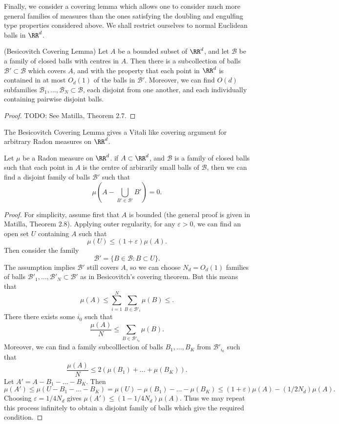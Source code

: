 Finally, we consider a covering lemma which allows one to consider much more general families of measures than the ones satisfying the doubling and engulfing type properties considered above. We shall restrict ourselves to normal Euclidean balls in $\RR^d$.

\begin{lemma} (Besicovitch Covering Lemma)
    Let $A$ be a bounded subset of $\RR^d$, and let $\mathcal{B}$ be a family of closed balls with centres in $A$. Then there is a subcollection of balls $\mathcal{B}' \subset \mathcal{B}$ which covers $A$, and with the property that each point in $\RR^d$ is contained in at most $O_d(1)$ of the balls in $\mathcal{B}'$. Moreover, we can find $O(d)$ subfamilies $\mathcal{B}_1,\dots, \mathcal{B}_N \subset \mathcal{B}$, each disjoint from one another, and each individually containing pairwise disjoint balls.
\end{lemma}
\begin{proof}
    TODO: See Matilla, Theorem 2.7.
\end{proof}

The Besicovitch Covering Lemma gives a Vitali like covering argument for arbitrary Radon measures on $\RR^d$.

\begin{theorem}
    Let $\mu$ be a Radon measure on $\RR^d$. if $A \subset \RR^d$, and $\mathcal{B}$ is a family of closed balls such that each point in $A$ is the centre of arbirarily small balls of $\mathcal{B}$, then we can find a disjoint family of balls $\mathcal{B}'$ such that
    \[ \mu \left( A - \bigcup_{B' \in \mathcal{B}'} B' \right) = 0. \]
\end{theorem}
\begin{proof}
    For simplicity, assume first that $A$ is bounded (the general proof is given in Matilla, Theorem 2.8). Applying outer regularity, for any $\varepsilon > 0$, we can find an open set $U$ containing $A$ such that
    \[ \mu(U) \leq (1 + \varepsilon) \mu(A). \]
    Then consider the family
    \[ \mathcal{B}' = \{ B \in \mathcal{B}: B \subset U \}. \]
    The assumption implies $\mathcal{B}'$ still covers $A$, so we can choose $N_d = O_d(1)$ families of balls $\mathcal{B}'_1,\dots,\mathcal{B}'_N \subset \mathcal{B}'$ as in Besicovitch's covering theorem. But this means that
    \[ \mu(A) \leq \sum_{i = 1}^N \sum_{B \in \mathcal{B}'_i} \mu(B) \leq.  \]
    There there exists some $i_0$ such that
    \[ \frac{\mu(A)}{N} \leq \sum_{B \in \mathcal{B}'_{i_0}} \mu(B). \]
    Moreover, we can find a family subcolllection of balls $B_1,\dots,B_K$ from $\mathcal{B}'_{i_0}$ such that
    \[ \frac{\mu(A)}{N} \leq 2 ( \mu(B_1) + \dots + \mu(B_K) ). \]
    Let $A' = A - B_1 - \dots - B_K$. Then
    \[ \mu(A') \leq \mu( U - B_1 - \dots - B_K ) = \mu(U) - \mu(B_1) - \dots - \mu(B_K) \leq (1 + \varepsilon) \mu(A) - (1/2N_d) \mu(A). \]
    Choosing $\varepsilon = 1/4N_d$ gives $\mu(A') \leq (1 - 1/4N_d) \mu(A)$. Thus we may repeat this process infinitely to obtain a disjoint family of balls which give the required condition.
\end{proof}

